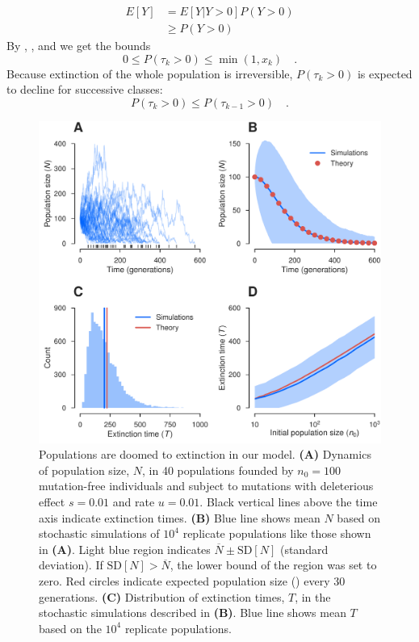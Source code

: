 \documentclass[9pt,lineno]{elife}
\begin{document}
\begin{align}
%
E[Y]  & =   E\left[Y|Y>0\right] P(Y>0)\nonumber\\
      & \geq  P(Y>0)
%
\label{eq:exp}
\end{align}
%
By , , and  we get the bounds 
%
\begin{equation}
%
0 \leq P(\tau_{k} > 0) \leq \min(1,x_{k}) \quad .
\label{eq:bounds}
%
\end{equation}
Because extinction of the whole population is irreversible, $P(\tau_{k} > 0)$ is expected to decline for successive classes:
\[ P(\tau_k>0) \leq P(\tau_{k-1}>0) \quad . \]


\begin{figure}[ht!]
\includegraphics[width=.67\linewidth]{decay.pdf}
\caption{Populations are doomed to extinction in our model.  
%
\textbf{(A)} Dynamics of population size, $N$, in 40 populations founded by $n_0=100$ mutation-free individuals and subject to mutations with deleterious effect $s=0.01$ and rate $u=0.01$.  Black vertical lines above the time axis indicate extinction times.
%
\textbf{(B)} Blue line shows mean $N$ based on stochastic simulations of $10^4$ replicate populations like those shown in \textbf{(A)}.  
Light blue region indicates $\overline{N} \pm \mathrm{SD}[N]$ (standard deviation). If $\mathrm{SD}[N] > \overline{N}$, the lower bound of the region was set to zero.  
Red circles indicate expected population size () every 30 generations.
%
\textbf{(C)} Distribution of extinction times, $T$, in the stochastic simulations described in \textbf{(B)}. 
Blue line shows mean $T$ based on the $10^4$ replicate populations.  
}
\end{figure}
\end{document}
